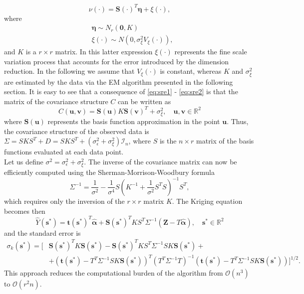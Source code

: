 \documentclass[11pt]{article}
\begin{document}
\begin{equation}
\nu (\cdot) = \bm{S} (\cdot)^T \bm{\eta} + \xi (\cdot),
\label{eq:sre1}
\end{equation} 
where 
\begin{equation}
\begin{split}
&\bm{\eta} \sim N_r (\bm{0}, K)
\\
&\xi (\cdot) \sim N(0, \sigma_\xi^2 V_\xi (\cdot) ),
\end{split}
\label{eq:sre2}
\end{equation}
and $K$ is a $r \times r$ matrix. In this latter expression $\xi(\cdot)$ represents the fine scale variation process that accounts for the error introduced by the dimension reduction. In the following we assume that $V_\xi (\cdot)$ is constant, whereas $K$ and $\sigma_\xi^2$ are estimated by the data via the EM algorithm presented in the following section. It is easy to see that a consequence of \eqref{eq:sre1} - \eqref{eq:sre2} is that the matrix of the covariance structure $C$ can be written as 
\begin{equation*}
C (\bm{u}, \bm{v}) = \bm{S}(\bm{u}) K \bm{S}(\bm{v})^T + \sigma_\xi^2, \quad \bm{u}, \bm{v} \in \mathbb{R}^2
\end{equation*}
where $\bm{S}(\bm{u})$ represents the basis function approximation in the point $\bm{u}$. Thus, the covariance structure of the observed data is $\Sigma = S K S^T + D = S K S^T + (\sigma_\epsilon^2 + \sigma_\xi^2) \mathcal{I}_n$, where $S$ is the $n \times r$ matrix of the basis functions evaluated at each data point.\\

Let us define $\sigma^2 = \sigma_\epsilon^2 + \sigma_\xi^2$. The inverse of the covariance matrix can now be efficiently computed using the Sherman-Morrison-Woodbury formula
$$\Sigma^{-1} = \frac{1}{\sigma^2} - \frac{1}{\sigma^4} S \left( K^{-1} + \frac{1}{\sigma^2}S^T S \right)^{-1} S^T, $$
which requires only the inversion of the $r \times r$ matrix $K$. The Kriging equation becomes then
\begin{equation}
\hat{Y}(\bm{s}^*) = \bm{t}(\bm{s}^*)^T \hat{\bm{\alpha}} + \bm{S}(\bm{s}^*)^T K S^T \Sigma^{-1} (\bm{Z} - T \hat{\bm{\alpha}}), \quad \bm{s}^* \in \mathbb{R}^2
\end{equation}
and the standard error is
\begin{equation}
\begin{split}
\sigma_k(\bm{s}^*) = \big[ &\bm{S}(\bm{s}^*)^T K \bm{S}(\bm{s}^*) - \bm{S}(\bm{s}^*)^T K S^T \Sigma^{-1} S K \bm{S}(\bm{s}^*) + 
\\
&+ (\bm{t}(\bm{s}^*) - T^T \Sigma^{-1} S K \bm{S}(\bm{s}^*))^T (T^T \Sigma^{-1} T)^{-1} (\bm{t}(\bm{s}^*) - T^T \Sigma^{-1} S K \bm{S}(\bm{s}^*)) \big]^{1/2}.
\end{split}
\end{equation}
This approach reduces the computational burden of the algorithm from $\mathcal{O}(n^3)$ to $\mathcal{O}(r^2 n)$.
\end{document}
